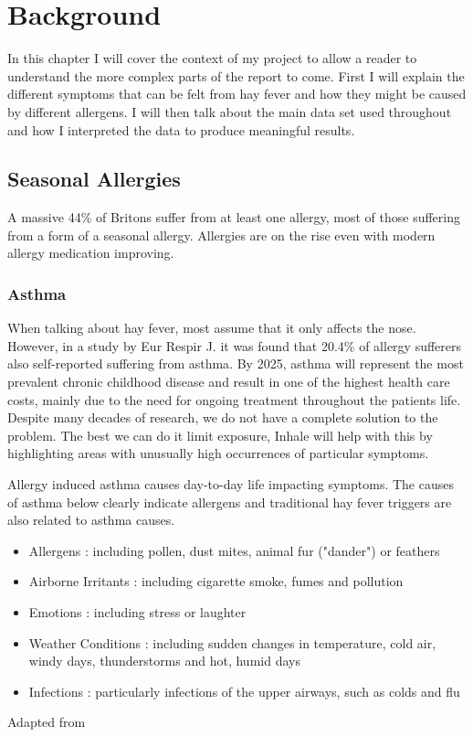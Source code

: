 \chapter{Background}
\label{cha:back}

In this chapter I will cover the context of my project to allow a reader to understand the more complex parts of the report to come. First I will explain the different symptoms that can be felt from hay fever and how they might be caused by different allergens. I will then talk about the main data set used throughout and how I interpreted the data to produce meaningful results.

\section{Seasonal Allergies}
A massive 44\% of Britons suffer from at least one allergy, most of those suffering from a form of a seasonal allergy. Allergies are on the rise even with modern allergy medication improving.
\cite{mintelallergy}

\subsection{Asthma}
When talking about hay fever, most assume that it only affects the nose. However, in a study by Eur Respir J. it was found that 20.4\% of allergy sufferers also self-reported suffering from asthma\cite{rhinitis}. By 2025, asthma will represent the most prevalent chronic childhood disease and result in one of the highest health care costs, mainly due to the need for ongoing treatment throughout the patients life\cite{childhood}. Despite many decades of research, we do not have a complete solution to the problem. The best we can do it limit exposure, Inhale will help with this by highlighting areas with unusually high occurrences of particular symptoms.

Allergy induced asthma causes day-to-day life impacting symptoms. The causes of asthma below clearly indicate allergens and traditional hay fever triggers are also related to asthma causes.\\


\begin{itemize}
  \item Allergens : including pollen, dust mites, animal fur ("dander") or feathers
  \item Airborne Irritants : including cigarette smoke, fumes and pollution
  \item Emotions : including stress or laughter
  \item Weather Conditions : including sudden changes in temperature, cold air, windy days, thunderstorms and hot, humid days
  \item Infections : particularly infections of the upper airways, such as colds and flu
\end{itemize}Adapted from \cite{urlasthmacauses}\\

